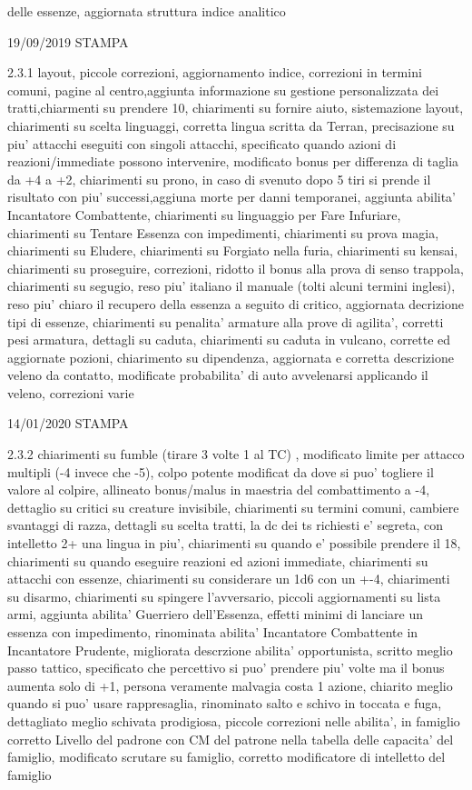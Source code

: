 \documentclass[a4paper,11pt,twoside,openany]{dndbook}
\begin{document}
{{delle essenze, aggiornata struttura indice analitico

19/09/2019 STAMPA

2.3.1 layout, piccole correzioni, aggiornamento indice, correzioni in termini comuni, pagine al centro,aggiunta informazione su gestione personalizzata dei tratti,chiarmenti su prendere 10, chiarimenti su fornire aiuto, sistemazione layout, chiarimenti su scelta linguaggi, corretta lingua scritta da Terran, precisazione su piu' attacchi eseguiti con singoli attacchi, specificato quando azioni di reazioni/immediate possono intervenire, modificato bonus per differenza di taglia da +4 a +2, chiarimenti su prono, in caso di svenuto dopo 5 tiri si prende il risultato con piu' successi,aggiuna morte per danni temporanei, aggiunta abilita' Incantatore Combattente, chiarimenti su linguaggio per Fare Infuriare, chiarimenti su Tentare Essenza con impedimenti, chiarimenti su prova magia, chiarimenti su Eludere, chiarimenti su Forgiato nella furia, chiarimenti su kensai, chiarimenti su proseguire, correzioni, ridotto il bonus alla prova di senso trappola, chiarimenti su segugio, reso piu' italiano il manuale (tolti alcuni termini inglesi), reso piu' chiaro il recupero della essenza a seguito di critico, aggiornata decrizione tipi di essenze, chiarimenti su penalita' armature alla prove di agilita', corretti pesi armatura, dettagli su caduta, chiarimenti su caduta in vulcano, corrette ed aggiornate pozioni, chiarimento su dipendenza, aggiornata e corretta descrizione veleno da contatto, modificate probabilita' di auto avvelenarsi applicando il veleno, correzioni varie

14/01/2020 STAMPA

2.3.2 chiarimenti su fumble (tirare 3 volte 1 al TC) , modificato limite per attacco multipli (-4 invece che -5), colpo potente modificat da dove si puo' togliere il valore al colpire, allineato bonus/malus in maestria del combattimento a -4, dettaglio su critici su creature invisibile, chiarimenti su termini comuni, cambiere svantaggi di razza, dettagli su scelta tratti, la dc dei ts richiesti e' segreta, con intelletto 2+ una lingua in piu', chiarimenti su quando e' possibile prendere il 18, chiarimenti su quando eseguire reazioni ed azioni immediate, chiarimenti su attacchi con essenze, chiarimenti su considerare un 1d6 con un +-4, chiarimenti su disarmo, chiarimenti su spingere l'avversario, piccoli aggiornamenti su lista armi, aggiunta abilita' Guerriero dell'Essenza, effetti minimi di lanciare un essenza con impedimento, rinominata abilita' Incantatore Combattente in Incantatore Prudente, migliorata descrzione abilita' opportunista, scritto meglio passo tattico, specificato che percettivo si puo' prendere piu' volte ma il bonus aumenta solo di +1, persona veramente malvagia costa 1 azione, chiarito meglio quando si puo' usare rappresaglia, rinominato salto e schivo in toccata e fuga, dettagliato meglio schivata prodigiosa, piccole correzioni nelle abilita', in famiglio corretto Livello del padrone con CM del patrone nella tabella delle capacita' del famiglio, modificato scrutare su famiglio, corretto modificatore di intelletto del famiglio

}}
\end{document}
